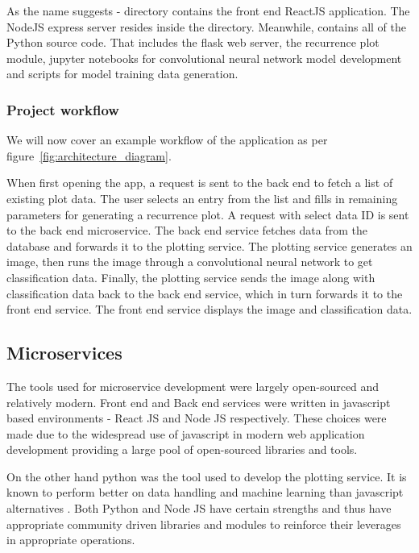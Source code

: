 \documentclass[a4paper,12pt,fleqn]{article}
\begin{document}
As the name suggests -  directory contains the front end ReactJS application.
The NodeJS express\cite{express} server resides inside the  directory.
Meanwhile,  contains all of the Python source code. That includes the flask \cite{flask} web server, the recurrence plot module, jupyter notebooks for convolutional neural network model development and scripts for model training data generation.


\subsubsection{Project workflow}
We will now cover an example workflow of the application as per figure~\ref{fig:architecture_diagram}.

When first opening the app, a request is sent to the back end to fetch a list of existing plot data.
The user selects an entry from the list and fills in remaining parameters for generating a recurrence plot.
A request with select data ID is sent to the back end microservice.
The back end service fetches data from the database and forwards it to the plotting service.
The plotting service generates an image, then runs the image through a convolutional neural network to get classification data.
Finally, the plotting service sends the image along with classification data back to the back end service, which in turn forwards it to the front end service.
The front end service displays the image and classification data.


\subsection{Microservices}
The tools used for microservice development were largely open-sourced and relatively modern.
Front end and Back end services were written in javascript
based environments - React JS and Node JS respectively.
These choices were made due to the widespread use of javascript in modern web application development providing a large pool of open-sourced libraries and tools.

On the other hand python was the tool used to develop the plotting service. It is known to perform better on data handling and machine learning than javascript alternatives \cite{javascript_vs_python_ml}.
Both Python and Node JS have certain strengths and thus have appropriate community driven libraries and modules to reinforce their leverages in appropriate operations.
\end{document}
